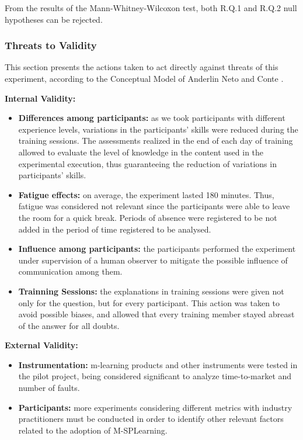 From the results of the Mann-Whitney-Wilcoxon test, both R.Q.1 and R.Q.2 null hypotheses can be rejected.

\subsubsection{Threats to Validity}\label{sec:threats}

This section presents the actions taken to act directly against threats of this experiment, according to the Conceptual Model of Anderlin Neto and Conte \cite{neto13}.

\textbf{Internal Validity:}

\begin{itemize}
\item \textbf{Differences among participants:} as we took participants with different experience levels, variations in the participants' skills were reduced during the training sessions. The assessments realized in the end of each day of training allowed to evaluate the level of knowledge in the content used in the experimental execution, thus guaranteeing the reduction of variations in participants' skills.

\item \textbf{Fatigue effects:} on average, the experiment lasted 180 minutes. Thus, fatigue was considered not relevant since the participants were able to leave the room for a quick break. Periods of absence were registered to be not added in the period of time registered to be analysed.

\item \textbf{Influence among participants:} the participants performed the experiment under supervision of a human observer to mitigate the possible influence of communication among them.

\item \textbf{Trainning Sessions:} the explanations in training sessions were given not only for the question, but for every participant. This action was taken to avoid possible biases, and allowed that every training member stayed abreast of the answer for all doubts.
\end{itemize}

\textbf{External Validity:}

\begin{itemize}

\item \textbf{Instrumentation:} m-learning products and other instruments were tested in the pilot project, being considered significant to analyze time-to-market and number of faults.

\item \textbf{Participants:} more experiments considering different metrics with industry practitioners must be conducted in order to identify other relevant factors related to the adoption of M-SPLearning.

\end{itemize}

